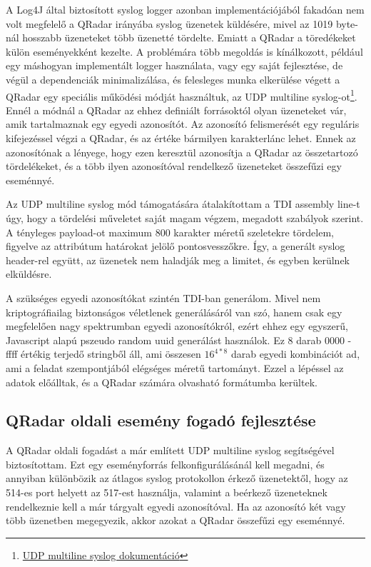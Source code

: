 A Log4J által biztosított syslog logger azonban implementációjából fakadóan nem volt megfelelő a QRadar irányába syslog üzenetek küldésére, mivel az 1019 byte-nál hosszabb üzeneteket több üzenetté tördelte. Emiatt a QRadar a töredékeket külön eseményekként kezelte. A problémára több megoldás is kínálkozott, például egy máshogyan implementált logger használata, vagy egy saját fejlesztése, de végül a dependenciák minimalizálása, és felesleges munka elkerülése végett a QRadar egy speciális működési módját használtuk, az UDP multiline syslog-ot\footnote{ \href{https://www.ibm.com/support/knowledgecenter/SS42VS_7.2.2/com.ibm.qradar.doc_7.2.2/t_logsource_UDPmultiprotocol.html}{UDP multiline syslog dokumentáció}}. Ennél a módnál a QRadar az ehhez definiált forrásoktól olyan üzeneteket vár, amik tartalmaznak egy egyedi azonosítót. Az azonosító felismerését egy reguláris kifejezéssel végzi a QRadar, és az értéke bármilyen karakterlánc lehet. Ennek az azonosítónak a lényege, hogy ezen keresztül azonosítja a QRadar az összetartozó tördelékeket, és a több ilyen azonosítóval rendelkező üzeneteket összefűzi egy eseménnyé.

Az UDP multiline syslog mód támogatására átalakítottam a TDI assembly line-t úgy, hogy a tördelési műveletet saját magam végzem, megadott szabályok szerint. A tényleges payload-ot maximum 800 karakter méretű szeletekre tördelem, figyelve az attribútum határokat jelölő pontosvesszőkre. Így, a generált syslog header-rel együtt, az üzenetek nem haladják meg a limitet, és egyben kerülnek elküldésre. 

A szükséges egyedi azonosítókat szintén TDI-ban generálom. Mivel nem kriptográfiailag biztonságos véletlenek generálásáról van szó, hanem csak egy megfelelően nagy spektrumban egyedi azonosítókról, ezért ehhez egy egyszerű, Javascript alapú pszeudo random uuid generálást használok. Ez 8 darab 0000 - ffff értékig terjedő stringből áll, ami összesen $16^{4 * 8} $ darab egyedi kombinációt ad, ami a feladat szempontjából elégséges méretű tartományt. Ezzel a lépéssel az adatok előálltak, és a QRadar számára olvasható formátumba kerültek.


\subsection{QRadar oldali esemény fogadó fejlesztése}

A QRadar oldali fogadást a már említett UDP multiline syslog segítségével biztosítottam. Ezt egy eseményforrás felkonfigurálásánál kell megadni, és annyiban különbözik az átlagos syslog protokollon érkező üzenetektől, hogy az 514-es port helyett az 517-est használja, valamint a beérkező üzeneteknek rendelkeznie kell a már tárgyalt egyedi azonosítóval. Ha az azonosító két vagy több üzenetben megegyezik, akkor azokat a QRadar összefűzi egy eseménnyé.

